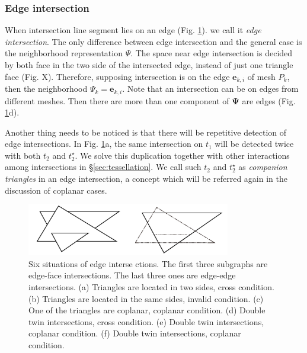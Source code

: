 \documentclass[10pt,journal,compsoc]{IEEEtran}
\begin{document}
\subsubsection{Edge intersection}





When intersection line segment lies on an edge (Fig. \ref{fig:twin}). we call it \emph{edge intersection}. The only difference between edge intersection and the general case is the neighborhood representation $\Psi$. The space near edge intersection is decided by both face in the two side of the intersected edge, instead of just one triangle face (Fig. X). Therefore, supposing intersection is on the edge $\bm{e}_{k, i}$ of mesh $P_k$, then the neighborhood $\Psi_k = \bm{e}_{k, i}$. Note that an intersection can be on edges from different meshes. Then there are more than one component of $\bm{\Psi}$ are edges (Fig. \ref{fig:twin}d).

Another thing needs to be noticed is that there will be repetitive detection of edge intersections. In Fig. \ref{fig:twin}a, the same intersection on $t_1$ will be detected twice with both $t_2$ and $t_2^{\star}$. We solve this duplication together with other interactions among intersections in \S\ref{sec:tessellation}. We call such $t_2$ and $t_2^{\star}$ as \emph{companion triangles} in an edge intersection, a concept which will be referred again in the discussion of coplanar cases.

\begin{figure}[t]
\centering
\includegraphics[width=3.5in]{edgeisect}
\caption{Six situations of edge interse ctions. The first three subgraphs are edge-face intersections. The last three ones are edge-edge intersections. (a) Triangles are located in two sides, cross condition. (b) Triangles are located in the same sides, invalid condition. (c) One of the triangles are coplanar, coplanar condition. (d) Double twin intersections, cross condition. (e) Double twin intersections, coplanar condition. (f) Double twin intersections, coplanar condition.}
\label{fig:twin}
\end{figure}
\end{document}
